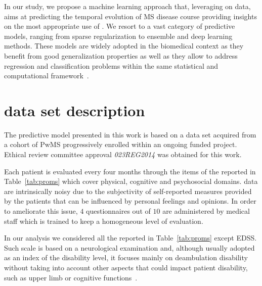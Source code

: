 In our study, we propose a machine learning approach that, leveraging on \PCO data, aims at predicting the temporal evolution of MS disease course providing insights on the most appropriate use of \PCOs.
We resort to a vast category of predictive models, ranging from sparse regularization to ensemble and deep learning methods.
These models are widely adopted in the biomedical context as they benefit from good generalization properties as well as they allow to address regression and classification problems within the same statistical and computational framework~\cite{lecun2015deep, qi2012random, nowak2011fused,  teramoto2009balanced, zou2005regularization}.

\section{\PCOs data set description}\label{sec:proms_data_collection}


The predictive model presented in this work is based on a \PCO data set acquired from a cohort of PwMS progressively enrolled within an ongoing funded project. Ethical review committee approval \textit{023REG2014} was obtained for this work.  %

Each patient is evaluated every four months through the items of the \PCOs reported in Table~\ref{tab:proms} which cover physical, cognitive and psychosocial domains.
\PCO data are intrinsically noisy due to the subjectivity of self-reported measures provided by the patients that can be influenced by personal feelings and opinions. In order to ameliorate this issue, $4$ questionnaires out of $10$ are administered by medical staff which is trained to keep a homogeneous level of evaluation.

In our analysis we considered all the \PCOs reported in Table~\ref{tab:proms} except EDSS. Such scale is based on a neurological examination and, although usually adopted as an index of the disability level, it focuses mainly on deambulation disability without taking into account other aspects that could impact patient disability, such as upper limb or cognitive functions~\cite{meyer2014systematic, uitdehaag2014clinical}.

